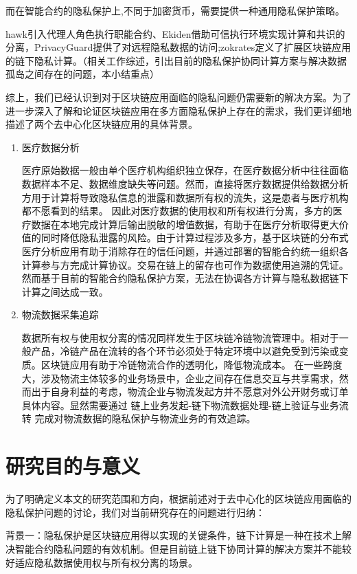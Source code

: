 而在智能合约的隐私保护上,不同于加密货币，需要提供一种通用隐私保护策略。

hawk引入代理人角色执行职能合约、Ekiden借助可信执行环境实现计算和共识的分离，PrivacyGuard提供了对远程隐私数据的访问;zokrates定义了扩展区块链应用的链下隐私计算。（相关工作综述，引出目前的隐私保护协同计算方案与解决数据孤岛之间存在的问题，本小结重点）

综上，我们已经认识到对于区块链应用面临的隐私问题仍需要新的解决方案。为了进一步深入了解和论证区块链应用在多方面隐私保护上存在的需求，我们更详细地描述了两个去中心化区块链应用的具体背景。

\begin{enumerate}

\item 医疗数据分析

医疗原始数据一般由单个医疗机构组织独立保存，在医疗数据分析中往往面临数据样本不足、数据维度缺失等问题。然而，直接将医疗数据提供给数据分析方用于计算将导致隐私信息的泄露和数据所有权的流失，这是患者与医疗机构都不愿看到的结果。
因此对医疗数据的使用权和所有权进行分离，多方的医疗数据在本地完成计算后输出脱敏的增值数据，有助于在医疗分析取得更大价值的同时降低隐私泄露的风险。由于计算过程涉及多方，基于区块链的分布式医疗分析应用有助于消除存在的信任问题，并通过部署的智能合约统一组织各计算参与方完成计算协议。交易在链上的留存也可作为数据使用追溯的凭证。然而基于目前的智能合约隐私保护方案，无法在协调各方计算与隐私数据链下计算之间达成一致。
    
\item 物流数据采集追踪

数据所有权与使用权分离的情况同样发生于区块链冷链物流管理中。相对于一般产品，冷链产品在流转的各个环节必须处于特定环境中以避免受到污染或变质。区块链应用有助于冷链物流合作的透明化，降低物流成本。
在一些跨度大，涉及物流主体较多的业务场景中，企业之间存在信息交互与共享需求，然而出于自身利益的考虑，物流企业与物流发起方并不愿意对外公开财务或订单具体内容。显然需要通过 链上业务发起-链下物流数据处理-链上验证与业务流转 完成对物流数据的隐私保护与物流业务的有效追踪。

\end{enumerate}

\section{研究目的与意义}

为了明确定义本文的研究范围和方向，根据前述对于去中心化的区块链应用面临的隐私保护问题的讨论，我们对当前研究存在的问题进行归纳：

背景一：隐私保护是区块链应用得以实现的关键条件，链下计算是一种在技术上解决智能合约隐私问题的有效机制。但是目前链上链下协同计算的解决方案并不能较好适应隐私数据使用权与所有权分离的场景。

